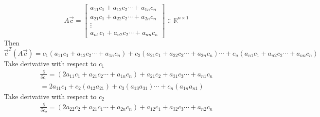 \documentclass[12pt]{article}
\begin{document}
\newpage
{}
\begin{enumerate}

\begin{equation*}
A\vec{c}= \begin{bmatrix}
a_{11}c_1+a_{12}c_2\cdots+a_{1n}c_n\\
a_{21}c_1+a_{22}c_2\cdots+a_{2n}c_n\\
\vdots\\
a_{n1}c_1+a_{n2}c_2\cdots+a_{nn}c_n
\end{bmatrix}\in\mathbb{R}^{n\times1}
\end{equation*}
Then \begin{equation*}
\vec{c}^T(A\vec{c})=c_1(a_{11}c_1+a_{12}c_2\cdots+a_{1n}c_n)+c_2(a_{21}c_1+a_{22}c_2\cdots+a_{2n}c_n)\cdots+c_n(a_{n1}c_1+a_{n2}c_2\cdots+a_{nn}c_n)
\end{equation*}
Take derivative with respect to $c_1$\begin{eqnarray*}
\frac{\partial}{\partial c_1}=(2a_{11}c_1+a_{21}c_2\cdots+a_{1n}c_n)+a_{21}c_2+a_{31}c_3\cdots+a_{n1}c_n\\=2a_{11}c_1+c_2(a_{12}a_{21})+c_3(a_{13}a_{31})\cdots+c_n(a_{1n}a_{n1})
\end{eqnarray*}
Take derivative with respect to $c_2$\begin{eqnarray*}
\frac{\partial}{\partial c_2}=(2a_{22}c_2+a_{21}c_1\cdots+a_{2n}c_n)+a_{12}c_1+a_{32}c_3\cdots+a_{n2}c_n\end{eqnarray*}



\end{enumerate}
\end{document}
